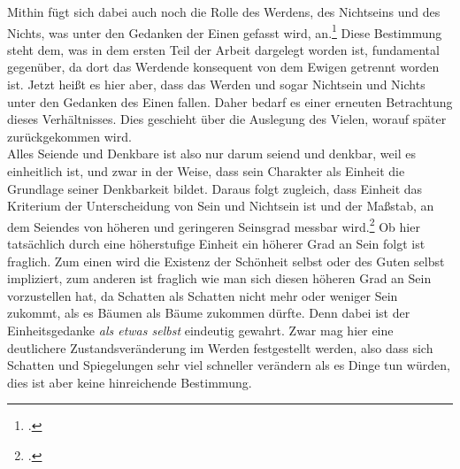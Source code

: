 Mithin fügt sich dabei auch noch die Rolle des Werdens, des Nichtseins und des Nichts, was unter den Gedanken der Einen gefasst wird, an.\footcite[vgl.][S. 97]{halfwassen2015spuren} Diese Bestimmung steht dem, was in dem ersten Teil der Arbeit dargelegt worden ist, fundamental gegenüber, da dort das Werdende konsequent von dem Ewigen getrennt worden ist. Jetzt heißt es hier aber, dass das Werden und sogar Nichtsein und Nichts unter den Gedanken des Einen fallen. Daher bedarf es einer erneuten Betrachtung dieses Verhältnisses. Dies geschieht über die Auslegung des Vielen, worauf später zurückgekommen wird.\\
Alles Seiende und Denkbare ist also nur darum seiend und denkbar, weil es einheitlich ist, und zwar in der Weise, dass sein Charakter als Einheit die Grundlage seiner Denkbarkeit bildet. Daraus folgt zugleich, dass Einheit das Kriterium der Unterscheidung von Sein und Nichtsein ist und der Maßstab, an dem Seiendes von höheren und geringeren Seinsgrad messbar wird.\footcite[vgl.][S. 99]{halfwassen2015spuren}
Ob hier tatsächlich durch eine höherstufige Einheit ein höherer Grad an Sein folgt ist fraglich. Zum einen wird die Existenz der Schönheit selbst oder des Guten selbst impliziert, zum anderen ist fraglich wie man sich diesen höheren Grad an Sein vorzustellen hat, da Schatten als Schatten nicht mehr oder weniger Sein zukommt, als es Bäumen als Bäume zukommen dürfte. Denn dabei ist der Einheitsgedanke \emph{als etwas selbst} eindeutig gewahrt. Zwar mag hier eine deutlichere Zustandsveränderung im Werden festgestellt werden, also dass sich Schatten und Spiegelungen sehr viel schneller verändern als es Dinge tun würden, dies ist aber keine hinreichende Bestimmung. 
